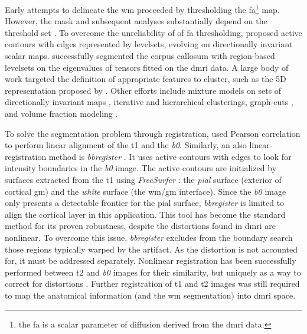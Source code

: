 Early attempts to delineate the \gls*{wm} proceeded by thresholding the 
  \gls*{fa}\footnote{the \gls*{fa} is a scalar parameter of diffusion derived from
  the \gls*{dmri} data.} map.
However, the mask and subsequent analyses substantially depend on the threshold set
  \citep{taoka_fractional_2009}.
To overcome the unreliability of of \gls*{fa} thresholding,
  \cite{zhukov_level_2003} proposed active contours with edges represented
  by levelsets, evolving on directionally invariant scalar maps.
\cite{rousson_level_2004} successfully segmented the corpus callosum with
  region-based levelsets on the eigenvalues of tensors fitted on the
  \gls*{dmri} data.
A large body of work targeted the definition of appropriate features to cluster,
  such as the 5D representation proposed by \cite{jonasson_segmentation_2005}.
Other efforts include mixture models on sets of directionally invariant maps
  \citep{liu_brain_2007}, iterative \citep{hadjiprocopis_unbiased_2005} and
  hierarchical \citep{lu_segmentation_2008} clusterings,
  graph-cuts \citep{han_experimental_2009},
  and volume fraction modeling \citep{kumazawa_improvement_2013}.
 
To solve the segmentation problem through registration, \cite{saad_new_2009} 
  used Pearson correlation to perform linear alignment of the \gls*{t1} and 
  the \emph{b0}.
Similarly, an also linear-registration method is \emph{bbregister} \citep{greve_accurate_2009}.
It uses active contours with edges to look for intensity boundaries in the \emph{b0}
  image.
The active contours are initialized by surfaces extracted from the 
  \gls*{t1} using \emph{FreeSurfer} \citep{fischl_freesurfer_2012}:
  the \emph{pial} surface (exterior of cortical \gls*{gm}) and the \emph{white}
  surface (the \gls*{wm}/\gls*{gm} interface). 
Since the \emph{b0} image only presents a detectable frontier for the pial surface,
  \emph{bbregister} is limited to align the cortical layer in this
  application.
This tool has become the standard method for its proven robustness, despite the 
  distortions found in \gls*{dmri} are nonlinear.
To overcome this issue, \emph{bbregister} excludes from the boundary search those
  regions typically warped by the artifact.
As the distortion is not accounted for, it must be addressed separately.
Nonlinear registration has been successfully performed between \gls*{t2} and \emph{b0}
  images for their similarity, but uniquely as a way to correct for distortions
  \citep{kybic_unwarping_2000,studholme_accurate_2000,wu_comparison_2008,tao_variational_2009}.
Further registration of \gls*{t1} and \gls*{t2} images was still required to map the anatomical
  information (and the \gls*{wm} segmentation) into \gls*{dmri} space.

